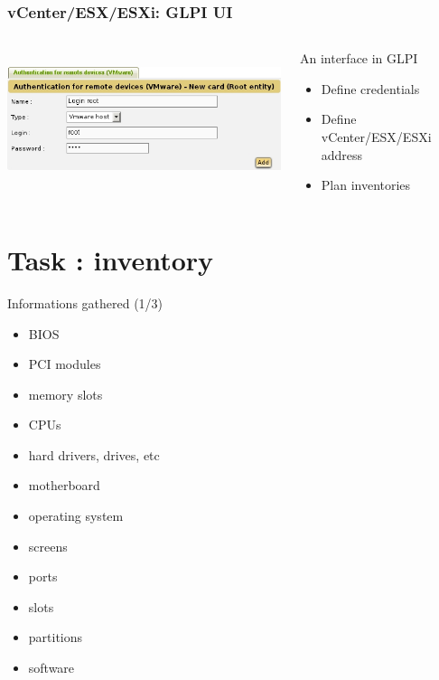 \documentclass{beamer}
\begin{document}
\begin{frame}[fragile]
    \frametitle{vCenter/ESX/ESXi: GLPI UI}

 \begin{columns}
 \begin{column}[T]{4cm}
    \includegraphics[height=4.0cm]{pics/esx-glpi.jpg}
 \end{column}
 \begin{column}[t]{6cm}
    \begin{block}{An interface in GLPI}
    \begin{itemize}
         \item Define credentials
         \item Define vCenter/ESX/ESXi address
         \item Plan inventories
    \end{itemize}
    \end{block}
 \end{column}
\end{columns}




\end{frame}

\section{Task : inventory}

\begin{frame}
    \begin{block}{Informations gathered (1/3)}
        \begin{itemize}
        \item BIOS
        \item PCI modules
        \item memory slots
        \item CPUs
        \item hard drivers, drives, etc
        \item motherboard
        \item operating system
        \item screens
        \item ports
        \item slots
        \item partitions
        \item software
        \end{itemize}
    \end{block}
\end{frame}
\end{document}
